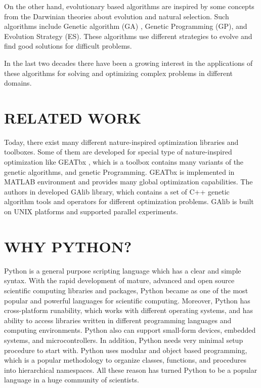 \documentclass[a4paper,twoside]{article}
\begin{document}
On the other hand, evolutionary based algorithms are inspired by some concepts from the Darwinian theories about evolution and natural selection. Such algorithms include Genetic algorithm (GA) \cite{Sivanandam}, Genetic Programming (GP)\cite{Koza1992}, and Evolution Strategy (ES)\cite{Beyer2002}. These algorithms use different strategies to evolve and find good solutions for difficult problems. 

In the last two decades there have been a growing interest in the applications of these algorithms for solving and optimizing complex problems  in different domains.



\section{\uppercase{Related Work}}
Today, there exist many different nature-inspired optimization libraries and toolboxes. Some of them are developed for special type of nature-inspired optimization like GEATbx \cite{GEATbx}, which is a toolbox contains many variants of the genetic algorithms, and genetic Programming. GEATbx is implemented in MATLAB environment and provides many global optimization capabilities. The authors in \cite {GAlib} developed GAlib library, which contains a set of C++ genetic algorithm tools and operators for different optimization problems. GAlib is built on UNIX platforms and supported parallel experiments.


\section{\uppercase{Why Python?}}

Python is a general purpose scripting language which has a clear and simple syntax. With the rapid development of mature, advanced  and open source scientific computing libraries and packages, Python became as one of the most popular and powerful languages for scientific computing.
Moreover, Python has cross-platform runability, which works with different operating systems, and has ability to access libraries written in different programming languages and computing environments. Python also can support small-form devices, embedded systems, and microcontrollers. In addition, Python needs very minimal setup procedure to start with. Python uses modular and object based programming, which is a popular methodology to organize classes, functions, and procedures into hierarchical namespaces. All these reason has turned Python to be a popular language in a huge community of scientists. 
\end{document}
